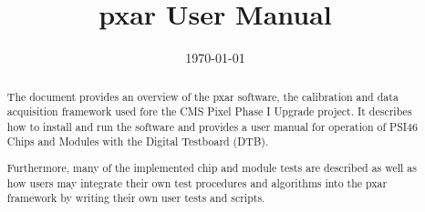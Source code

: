 \documentclass[11pt]{article}
\title{pxar User Manual} %
\author{
} %
\date{\today} %
\begin{document}
\maketitle %


\begin{abstract}
The document provides an overview of the pxar software, the calibration and data acquisition framework used fore the CMS Pixel Phase I Upgrade project. It describes how to install and run the software and provides a user manual for operation of
PSI46 Chips and Modules with the Digital Testboard (DTB).

Furthermore, many of the implemented chip and module tests are described as well as how users may integrate their own test procedures and algorithms into the pxar framework by writing their own user tests and scripts.
\end{abstract}

\newpage
\tableofcontents

\newpage


\newpage

\newpage

\newpage

\newpage

\newpage

\newpage


\newpage
\printglossaries

\newpage
\clearpage
{}
\begin{thebibliography}{99}
  
\end{thebibliography}
\end{document}
